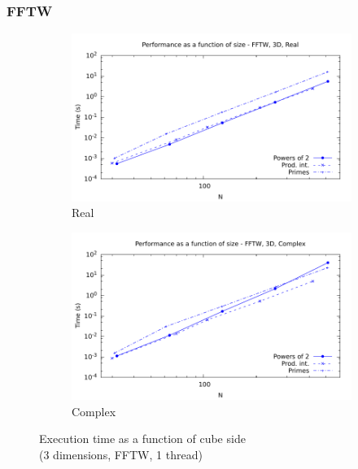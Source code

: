 \documentclass[12pt, a4paper]{article}
\begin{document}
\subsubsection{FFTW}
\begin{figure}[H]
\captionsetup{width=0.8\linewidth}
\centering
\begin{subfigure}{.5\textwidth}
\centering
\includegraphics[width=.9\linewidth]{graphs/performance/3d-fftw-r.pdf}
\caption{Real}
\label{3DFFTWR}
\end{subfigure}%
\begin{subfigure}{.5\textwidth}
\centering
\includegraphics[width=.9\linewidth]{graphs/performance/3d-fftw-c.pdf}
\caption{Complex}
\label{3DFFTWC}
\end{subfigure}
\caption{Execution time as a function of cube side\\(3 dimensions, FFTW, 1 thread)}
\label{3DFFTW}
\end{figure}
\end{document}
